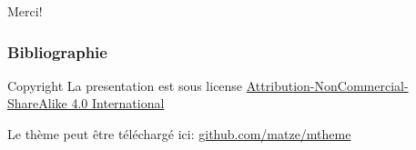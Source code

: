 \documentclass[compress, noflama]{beamer}
\begin{document}
\begin{frame}[standout]
  Merci!
\end{frame} 
 
\appendix 
 


\begin{frame}[allowframebreaks]
\frametitle{Bibliographie}
  

\end{frame}

\begin{frame}{Copyright}
La presentation est sous license \href{https://creativecommons.org/licenses/by-nc-sa/4.0/}{Attribution-NonCommercial-ShareAlike 4.0 International}

\begin{center}\ccbyncsa\end{center}

Le thème peut être téléchargé ici: \url{github.com/matze/mtheme}


\end{frame}
\end{document}
